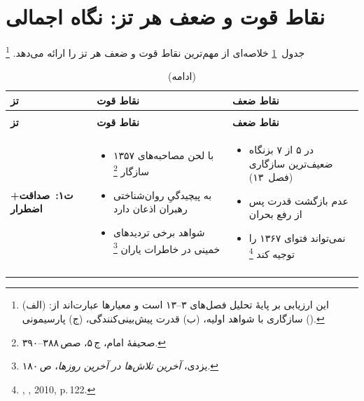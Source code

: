 \documentclass[12pt,a4paper]{book}
\newcommand{\en}[1]{\lr{\textit{#1}}}
\begin{document}
\section{نقاط قوت و ضعف هر تز: نگاه اجمالی}
\label{sec:ch14-strengths}

جدول~\ref{tab:strength-weakness} خلاصه‌ای از مهم‌ترین
نقاط قوت و ضعف هر تز را ارائه می‌دهد.%
\footnote{این ارزیابی بر پایهٔ تحلیل فصل‌های ۳–۱۳ است
و معیارها عبارت‌اند از:
(الف) سازگاری با شواهد اولیه،
(ب) قدرت پیش‌بینی‌کنندگی،
(ج) پارسیمونی (\en{parsimony}).}

{%
\small
\begin{longtable}{%
  >{\centering\arraybackslash}m{2.5cm}
  >{\arraybackslash}m{5cm}
  >{\arraybackslash}m{5cm}}
\caption{نقاط قوت و ضعف هر تز}
\label{tab:strength-weakness} \\
\toprule
\textbf{تز} & \textbf{نقاط قوت} & \textbf{نقاط ضعف} \\
\midrule
\endfirsthead
\caption[]{(ادامه)} \\
\toprule
\textbf{تز} & \textbf{نقاط قوت} & \textbf{نقاط ضعف} \\
\midrule
\endhead
\bottomrule
\endlastfoot

\cellcolor{cGreen!12}
\textbf{ت‌۱:\ صداقت\newline + اضطرار}
  & \begin{itemize}[nosep, leftmargin=*]
    \item با لحن مصاحبه‌های ۱۳۵۷ سازگار%
      \footnote{صحیفهٔ امام، ج\,۵، صص\,۳۸۸–۳۹۰.}
    \item به پیچیدگیِ روان‌شناختی رهبران اذعان دارد
    \item شواهد برخی تردیدهای خمینی در خاطرات یاران%
      \footnote{یزدی، \textit{آخرین تلاش‌ها در آخرین روزها}، ص\,۱۸۰.}
    \end{itemize}
  & \begin{itemize}[nosep, leftmargin=*]
    \item در ۵ از ۷ بزنگاه ضعیف‌ترین سازگاری (فصل~۱۳)
    \item عدم بازگشت قدرت پس از رفع بحران
    \item نمی‌تواند فتوای ۱۳۶۷ را توجیه کند%
      \footnote{\en{Robertson}, \textit{\en{Massacre}}, 2010, p.\,122.}
    \end{itemize} \\
\addlinespace


\end{longtable}}
\end{document}
